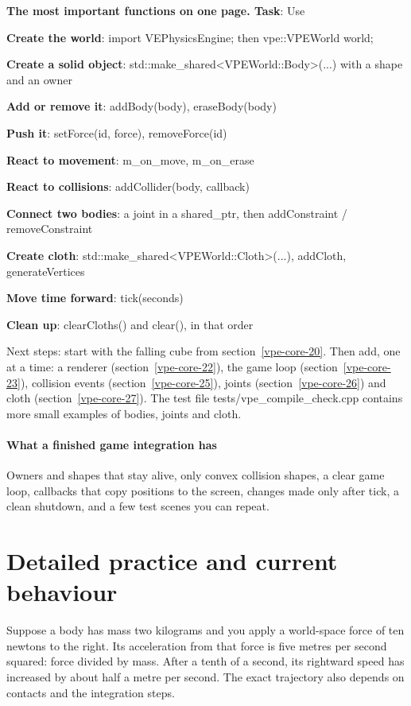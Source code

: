 \documentclass[11pt,a4paper]{article}
\begin{document}
\label{vpe-core-31}
\textbf{The most important functions on one page. Task}: Use

\textbf{Create the world}: import VEPhysicsEngine; then vpe::VPEWorld world;

\textbf{Create a solid object}: std::make\_shared<VPEWorld::Body>(...) with a shape and an owner

\textbf{Add or remove it}: addBody(body), eraseBody(body)

\textbf{Push it}: setForce(id, force), removeForce(id)

\textbf{React to movement}: m\_on\_move, m\_on\_erase

\textbf{React to collisions}: addCollider(body, callback)

\textbf{Connect two bodies}: a joint in a shared\_ptr, then addConstraint / removeConstraint

\textbf{Create cloth}: std::make\_shared<VPEWorld::Cloth>(...), addCloth, generateVertices

\textbf{Move time forward}: tick(seconds)

\textbf{Clean up}: clearCloths() and clear(), in that order

Next steps: start with the falling cube from section~\ref{vpe-core-20}. Then add, one at a time: a renderer (section~\ref{vpe-core-22}), the game loop (section~\ref{vpe-core-23}), collision events (section~\ref{vpe-core-25}), joints (section~\ref{vpe-core-26}) and cloth (section~\ref{vpe-core-27}). The test file tests/vpe\_compile\_check.cpp contains more small examples of bodies, joints and cloth.

\subsection*{What a finished game integration has}
Owners and shapes that stay alive, only convex collision shapes, a clear game loop, callbacks that copy positions to the screen, changes made only after tick, a clean shutdown, and a few test scenes you can repeat.

\clearpage\part{Detailed practice and current behaviour}
Suppose a body has mass two kilograms and you apply a world-space force of ten newtons to the right. Its acceleration from that force is five metres per second squared: force divided by mass. After a tenth of a second, its rightward speed has increased by about half a metre per second. The exact trajectory also depends on contacts and the integration steps.
\end{document}
